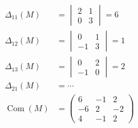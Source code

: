 \documentclass[../main.tex]{subfiles}
\begin{document}
\begin{align*}
    \Delta_{11}(M) &= \begin{vmatrix}
        2 & 1 \\
        0 & 3
    \end{vmatrix} = 6 \\
    \Delta_{12}(M) &= \begin{vmatrix}
        0 & 1 \\
        -1 & 3
    \end{vmatrix} = 1 \\
    \Delta_{13}(M) &= \begin{vmatrix}
        0 & 2 \\
        -1 & 0
    \end{vmatrix} = 2 \\
    \Delta_{21}(M) &= \cdots \\
    \operatorname{Com}(M) &= \begin{pmatrix}
        6 & -1 & 2 \\
        -6 & 2 & -2 \\
        4 & -1 & 2
    \end{pmatrix}
\end{align*}
\end{document}
